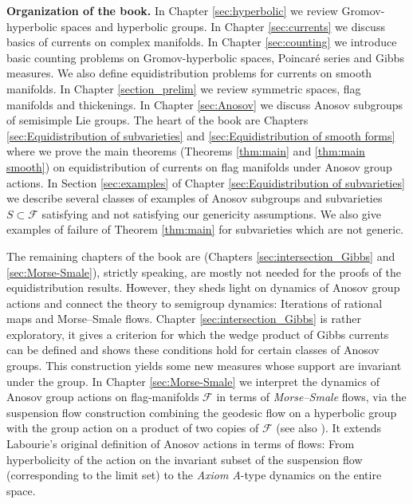 \documentclass[12pt]{amsbook}%
\theoremstyle{definition}
\theoremstyle{remark}
\numberwithin{section}{chapter}
\numberwithin{subsection}{section}
\numberwithin{figure}{chapter}
\newcommand\bac[1]{{\color{blue} #1} }
\def\bP{{\mathbb{P}}}
\def\cF{{\mathscr{F}}}
\def\Ga{\Gamma}
\begin{document}
\medskip
{\bf Organization of the book.} In Chapter \ref{sec:hyperbolic} we review Gromov-hyperbolic spaces and hyperbolic groups. In Chapter \ref{sec:currents} we discuss 
basics of currents on complex manifolds. In Chapter \ref{sec:counting} we introduce basic counting problems on Gromov-hyperbolic spaces, Poincar\'e series and Gibbs measures. We also define equidistribution problems for currents on smooth manifolds. 
 In   Chapter \ref{section_prelim}  we review symmetric spaces,  flag manifolds and thickenings. In Chapter \ref{sec:Anosov} we discuss Anosov subgroups of semisimple Lie groups. The heart of the book are Chapters \ref{sec:Equidistribution of subvarieties} 
 and \ref{sec:Equidistribution of smooth forms} 
 where we prove the main theorems (Theorems \ref{thm:main} and \ref{thm:main smooth}) on equidistribution of currents on flag manifolds under Anosov group actions.  In Section \ref{sec:examples} of Chapter \ref{sec:Equidistribution of subvarieties}  we describe several classes of examples of Anosov subgroups and subvarieties $S\subset \cF$ satisfying and not satisfying our genericity assumptions. We also give examples of failure of Theorem \ref{thm:main} for subvarieties which are not generic. 


The remaining chapters of the book are (Chapters \ref{sec:intersection_Gibbs} 
and \ref{sec:Morse-Smale}), 
strictly speaking, are mostly not needed for the proofs of the equidistribution results. 
However, they  
sheds light on dynamics of Anosov group actions and connect the theory to semigroup dynamics: Iterations of rational maps and 
Morse--Smale flows. Chapter \ref{sec:intersection_Gibbs} is rather exploratory, it gives a criterion for which the wedge product of Gibbs currents can be defined and shows these conditions hold for certain classes of Anosov groups. This construction yields some new measures whose support are invariant under the group. 
In Chapter \ref{sec:Morse-Smale} we interpret the dynamics of Anosov group actions on flag-manifolds $\cF$ in terms of {\em Morse--Smale} flows, via the suspension flow construction combining the geodesic flow on a hyperbolic group with the group action 
on a product of two copies of $\cF$ (see also \cite{Guichard-Wienhard}). It extends Labourie's original definition of Anosov actions in terms of flows: From hyperbolicity of the action on the invariant subset of the suspension flow (corresponding to the limit set) to the {\em Axiom A}-type dynamics on the entire space.  
\end{document}
